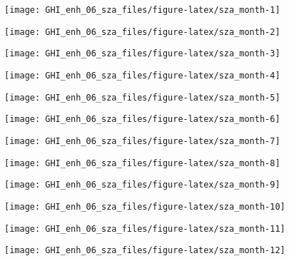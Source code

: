 \documentclass[
  10pt,
  a4paper,oneside]{article}
\begin{document}
\begin{center}\texttt{[image: GHI\_enh\_06\_sza\_files/figure-latex/sza\_month-1]} \end{center}

\begin{center}\texttt{[image: GHI\_enh\_06\_sza\_files/figure-latex/sza\_month-2]} \end{center}

\begin{center}\texttt{[image: GHI\_enh\_06\_sza\_files/figure-latex/sza\_month-3]} \end{center}

\begin{center}\texttt{[image: GHI\_enh\_06\_sza\_files/figure-latex/sza\_month-4]} \end{center}

\begin{center}\texttt{[image: GHI\_enh\_06\_sza\_files/figure-latex/sza\_month-5]} \end{center}

\begin{center}\texttt{[image: GHI\_enh\_06\_sza\_files/figure-latex/sza\_month-6]} \end{center}

\begin{center}\texttt{[image: GHI\_enh\_06\_sza\_files/figure-latex/sza\_month-7]} \end{center}

\begin{center}\texttt{[image: GHI\_enh\_06\_sza\_files/figure-latex/sza\_month-8]} \end{center}

\begin{center}\texttt{[image: GHI\_enh\_06\_sza\_files/figure-latex/sza\_month-9]} \end{center}

\begin{center}\texttt{[image: GHI\_enh\_06\_sza\_files/figure-latex/sza\_month-10]} \end{center}

\begin{center}\texttt{[image: GHI\_enh\_06\_sza\_files/figure-latex/sza\_month-11]} \end{center}

\begin{center}\texttt{[image: GHI\_enh\_06\_sza\_files/figure-latex/sza\_month-12]} \end{center}
\end{document}
